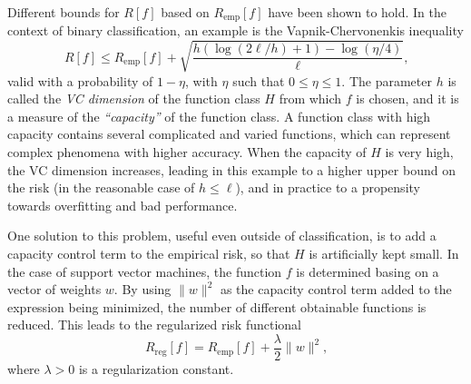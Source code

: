 \documentclass[12pt]{report}
\begin{document}
Different bounds for $ R[f] $ based on $ R_{\text{emp}}[f] $ have been shown to hold. In the context of binary classification, an example is the Vapnik-Chervonenkis inequality \cite{vapnik95}
\begin{equation} \label{vapnikbound}
R[f] \leq R_{\text{emp}}[f] + \sqrt{\dfrac{h(\log (2\ell /h) + 1) - \log (\eta /4)}{\ell}} \text{,}
\end{equation}
valid with a probability of $ 1 - \eta $, with $ \eta $ such that $ 0 \leq \eta \leq 1 $. The parameter $ h $ is called the \textit{VC dimension} of the function class $ H $ from which $ f $ is chosen, and it is a measure of the \textit{``capacity''} of the function class. A function class with high capacity contains several complicated and varied functions, which can represent complex phenomena with higher accuracy. When the capacity of $ H $ is very high, the VC dimension increases, leading in this example to a higher upper bound on the risk (in the reasonable case of $ h \leq \ell $), and in practice to a propensity towards overfitting and bad performance.

One solution to this problem, useful even outside of classification, is to add a capacity control term to the empirical risk, so that $ H $ is artificially kept small. In the case of support vector machines, the function $ f $ is determined basing on a vector of weights $ w $. By using $ \| w \|^2 $ as the capacity control term added to the expression being minimized, the number of different obtainable functions is reduced. This leads to the regularized risk functional \cite{tikhonov77}
\begin{equation} \label{regriskfun}
R_{\text{reg}}[f] = R_{\text{emp}}[f] + \dfrac{\lambda}{2}\| w \|^2 \text{,}
\end{equation}
where $ \lambda > 0 $ is a regularization constant.
\end{document}
